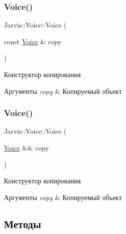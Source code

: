 \subsubsection{\texorpdfstring{Voice()}{Voice()}\hspace{0.1cm}{\footnotesize\ttfamily [2/3]}}
{\footnotesize\ttfamily Jarvis\+::\+Voice\+::\+Voice (\begin{DoxyParamCaption}\item[{const \hyperlink{classJarvis_1_1Voice}{Voice} \&}]{copy }\end{DoxyParamCaption})\hspace{0.3cm}{\ttfamily [default]}}



Конструктор копирования 


\begin{DoxyParams}{Аргументы}
{\em copy} & Копируемый объект \\
\hline
\end{DoxyParams}
\mbox{\label{classJarvis_1_1Voice_a3bac269758c6f299fbd1c661f3154747}} 
\subsubsection{\texorpdfstring{Voice()}{Voice()}\hspace{0.1cm}{\footnotesize\ttfamily [3/3]}}
{\footnotesize\ttfamily Jarvis\+::\+Voice\+::\+Voice (\begin{DoxyParamCaption}\item[{\hyperlink{classJarvis_1_1Voice}{Voice} \&\&}]{copy }\end{DoxyParamCaption})\hspace{0.3cm}{\ttfamily [default]}}



Конструктор копирования 


\begin{DoxyParams}{Аргументы}
{\em copy} & Копируемый объект \\
\hline
\end{DoxyParams}


\subsection{Методы}
\mbox{\label{classJarvis_1_1Voice_aacc05388ae250c1e515f993159443dff}} 
